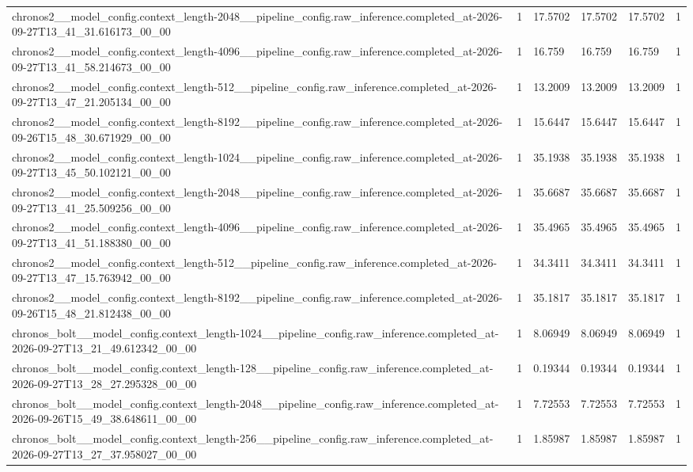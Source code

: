 \begin{tabular}{llllll}
chronos2\_\_model\_config.context\_length-2048\_\_pipeline\_config.raw\_inference.completed\_at-2026-09-27T13\_41\_31.616173\_00\_00 & 1 & 17.5702 & 17.5702 & 17.5702 & 1 \\
chronos2\_\_model\_config.context\_length-4096\_\_pipeline\_config.raw\_inference.completed\_at-2026-09-27T13\_41\_58.214673\_00\_00 & 1 & 16.759 & 16.759 & 16.759 & 1 \\
chronos2\_\_model\_config.context\_length-512\_\_pipeline\_config.raw\_inference.completed\_at-2026-09-27T13\_47\_21.205134\_00\_00 & 1 & 13.2009 & 13.2009 & 13.2009 & 1 \\
chronos2\_\_model\_config.context\_length-8192\_\_pipeline\_config.raw\_inference.completed\_at-2026-09-26T15\_48\_30.671929\_00\_00 & 1 & 15.6447 & 15.6447 & 15.6447 & 1 \\
chronos2\_\_model\_config.context\_length-1024\_\_pipeline\_config.raw\_inference.completed\_at-2026-09-27T13\_45\_50.102121\_00\_00 & 1 & 35.1938 & 35.1938 & 35.1938 & 1 \\
chronos2\_\_model\_config.context\_length-2048\_\_pipeline\_config.raw\_inference.completed\_at-2026-09-27T13\_41\_25.509256\_00\_00 & 1 & 35.6687 & 35.6687 & 35.6687 & 1 \\
chronos2\_\_model\_config.context\_length-4096\_\_pipeline\_config.raw\_inference.completed\_at-2026-09-27T13\_41\_51.188380\_00\_00 & 1 & 35.4965 & 35.4965 & 35.4965 & 1 \\
chronos2\_\_model\_config.context\_length-512\_\_pipeline\_config.raw\_inference.completed\_at-2026-09-27T13\_47\_15.763942\_00\_00 & 1 & 34.3411 & 34.3411 & 34.3411 & 1 \\
chronos2\_\_model\_config.context\_length-8192\_\_pipeline\_config.raw\_inference.completed\_at-2026-09-26T15\_48\_21.812438\_00\_00 & 1 & 35.1817 & 35.1817 & 35.1817 & 1 \\
chronos\_bolt\_\_model\_config.context\_length-1024\_\_pipeline\_config.raw\_inference.completed\_at-2026-09-27T13\_21\_49.612342\_00\_00 & 1 & 8.06949 & 8.06949 & 8.06949 & 1 \\
chronos\_bolt\_\_model\_config.context\_length-128\_\_pipeline\_config.raw\_inference.completed\_at-2026-09-27T13\_28\_27.295328\_00\_00 & 1 & 0.19344 & 0.19344 & 0.19344 & 1 \\
chronos\_bolt\_\_model\_config.context\_length-2048\_\_pipeline\_config.raw\_inference.completed\_at-2026-09-26T15\_49\_38.648611\_00\_00 & 1 & 7.72553 & 7.72553 & 7.72553 & 1 \\
chronos\_bolt\_\_model\_config.context\_length-256\_\_pipeline\_config.raw\_inference.completed\_at-2026-09-27T13\_27\_37.958027\_00\_00 & 1 & 1.85987 & 1.85987 & 1.85987 & 1 \\

\end{tabular}
